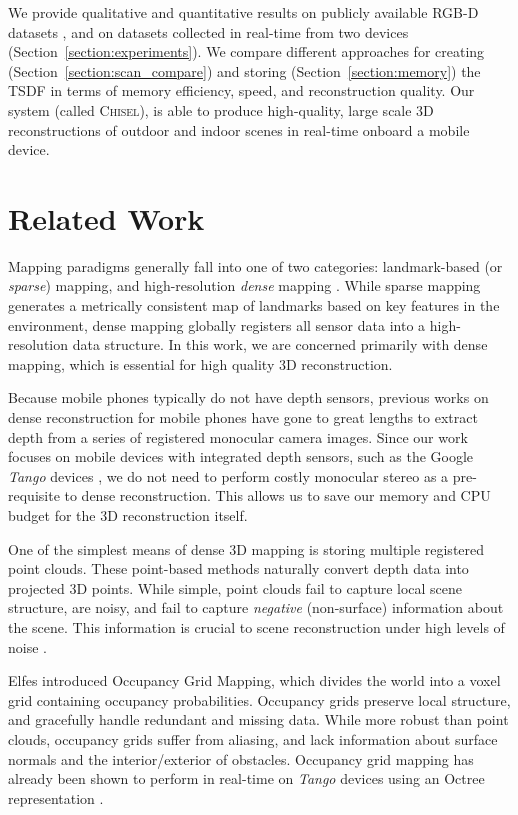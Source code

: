 \documentclass[conference]{IEEEtran}
\newcommand{\sref}[1]{Section~\ref{#1}}
\newcommand{\Tango}{\textit{Tango}\xspace}
\newcommand{\TSDF}{TSDF\xspace}
\newcommand{\chisel}{\textsc{Chisel}\xspace}
\begin{document}
 We provide qualitative and  quantitative results on publicly available RGB-D
 datasets \cite{FREIBURG}, and on datasets collected in real-time from two
 devices (\sref{section:experiments}). We compare different approaches for
 creating (\sref{section:scan_compare}) and storing (\sref{section:memory}) the
 \TSDF in terms of memory efficiency, speed, and reconstruction quality. Our
 system (called \chisel), is able to produce high-quality, large scale 3D
 reconstructions of outdoor and indoor scenes in real-time onboard a mobile device.

\section{Related Work}
Mapping paradigms generally fall into one of two categories: landmark-based (or
\emph{sparse}) mapping, and high-resolution \emph{dense} mapping
\cite{FastSlam}.  While sparse mapping generates a metrically consistent map of
landmarks based on key features in the environment, dense mapping globally
registers all sensor data into a high-resolution data structure. In this work,
we are concerned primarily with dense mapping, which is essential for high
quality 3D reconstruction.

Because mobile phones typically do not have depth sensors, previous works
\cite{TanskanenMetric, DTAM, LSDSlam} on dense reconstruction for mobile phones
have gone to great lengths to extract depth from a series of registered monocular camera
images. Since our work focuses on mobile devices with integrated depth sensors,
such as the Google \Tango devices \cite{Tango}, we do not need to perform
costly monocular stereo as a pre-requisite to dense reconstruction. This allows
us to save our memory and CPU budget for the 3D reconstruction itself.

One of the simplest means of dense 3D mapping is storing multiple registered
point clouds. These point-based methods \cite{RusinkiewiczPoints,
TanskanenMetric, WeiseScanning, LSDSlam} naturally convert depth data into
projected 3D points. While simple, point clouds fail to capture local scene
structure, are noisy, and fail to capture \emph{negative} (non-surface)
information about the scene. This information is crucial to scene reconstruction
under high levels of noise \cite{Klingensmith2014}.

Elfes \cite{Elfes1989} introduced Occupancy Grid Mapping, which divides the
world into a voxel grid containing occupancy probabilities. Occupancy grids
preserve local structure, and gracefully handle redundant and missing data.  
While more robust than point clouds, occupancy grids suffer from aliasing, and
lack information about surface normals and the interior/exterior of obstacles. 
Occupancy grid mapping has already been shown to perform in real-time on \Tango
\cite{Tango} devices using an Octree representation \cite{Wurm2010}.
\end{document}
